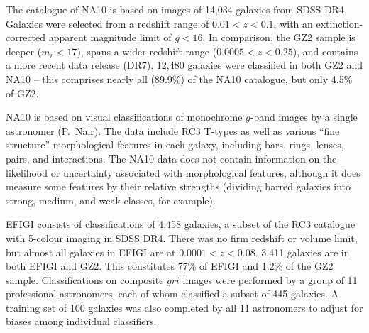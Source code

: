 \documentclass[useAMS,usenatbib]{mn2e}
\begin{document}
The catalogue of NA10 is based on images of 14,034 galaxies from SDSS DR4. Galaxies were selected from a redshift range of $0.01<z<0.1$, with an extinction-corrected apparent magnitude limit of $g<16$. In comparison, the GZ2 sample is deeper ($m_r<17$), spans a wider redshift range ($0.0005<z<0.25$), and contains a more recent data release (DR7). 12,480 galaxies were classified in both GZ2 and NA10 -- this comprises nearly all (89.9\%) of the NA10 catalogue, but only 4.5\% of GZ2. 

NA10 is based on visual classifications of monochrome $g$-band images by a single astronomer (P.~Nair). The data include RC3 T-types \citep[a numerical index of a galaxy's stage along the Hubble sequence;][]{dev91} as well as various ``fine structure'' morphological features in each galaxy, including bars, rings, lenses, pairs, and interactions. The NA10 data does not contain information on the likelihood or uncertainty associated with morphological features, although it does measure some features by their relative strengths (dividing barred galaxies into strong, medium, and weak classes, for example). 


EFIGI consists of classifications of 4,458 galaxies, a subset of the RC3 catalogue with 5-colour imaging in SDSS DR4. There was no firm redshift or volume limit, but almost all galaxies in EFIGI are at $0.0001<z<0.08$. 3,411 galaxies are in both EFIGI and GZ2. This constitutes 77\% of EFIGI and 1.2\% of the GZ2 sample. Classifications on composite $gri$ images were performed by a group of 11 professional astronomers, each of whom classified a subset of 445 galaxies. A training set of 100 galaxies was also completed by all 11 astronomers to adjust for biases among individual classifiers. 
\end{document}
